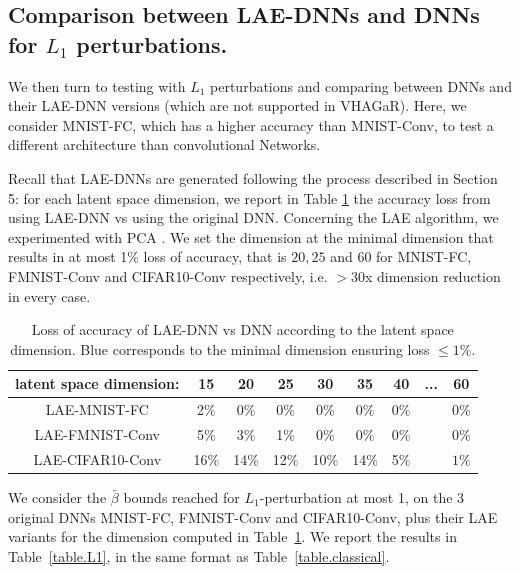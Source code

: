\subsection{Comparison between LAE-DNNs and DNNs for $L_1$ perturbations.}
	
\label{s62}

We then turn to testing with $L_1$ perturbations and comparing between DNNs and their LAE-DNN versions (which are not supported in VHAGaR). Here, we consider MNIST-FC, which has a higher accuracy than MNIST-Conv, 
to test a different architecture than convolutional Networks.

Recall that LAE-DNNs are generated following the process described in Section 5: for each latent space dimension, we report in Table \ref{table.LAE} the accuracy loss from using LAE-DNN vs using the original DNN. 
Concerning the LAE algorithm, we experimented with PCA 
\cite{Paco}.
We set the dimension at the minimal dimension that results in at most 1$\%$ 
loss of accuracy, that is $20, 25$ and $60$ for  MNIST-FC, FMNIST-Conv and CIFAR10-Conv respectively, i.e. $>30$x dimension reduction in every case.


\begin{table}[h!]
	\centering
	\begin{tabular}{|c c c c c c c c c |}\hline
		latent space dimension: & 15 & 20 & 25 & 30 & 35 & 40 & ... & 60 
		
		\\\hline
		LAE-MNIST-FC  & 2$\%$ & {\color{blue} 0$\%$} & 0$\%$& 0$\%$ & 0$\%$& 0$\%$ & &0$\%$
		\\	
 		LAE-FMNIST-Conv & 5$\%$ &	3$\%$ &	{\color{blue} 1$\%$} & 0$\%$& 0$\%$	&0$\%$ & &	0$\%$ 
		\\
		LAE-CIFAR10-Conv  & 16$\%$ &	14$\%$ &	12$\%$ & 10$\%$ &	14$\%$ &	5$\%$ &	& {\color{blue} $1\%$}
		\\\hline
	\end{tabular}

	\caption{Loss of accuracy of LAE-DNN vs DNN according to the latent space dimension.
	{\color{blue} Blue} corresponds to the minimal dimension ensuring loss $\leq 1\%$.}
	\vspace{-0.4cm}
    \label{table.LAE}
\end{table}

We consider the $\bar{\beta}$ bounds reached for $L_1$-perturbation  at most 1, on the 3 original DNNs MNIST-FC, FMNIST-Conv and CIFAR10-Conv, plus their LAE variants for the dimension computed in Table~\ref{table.LAE}.
We report the results in Table~\ref{table.L1}, in the same format as Table~\ref{table.classical}.





